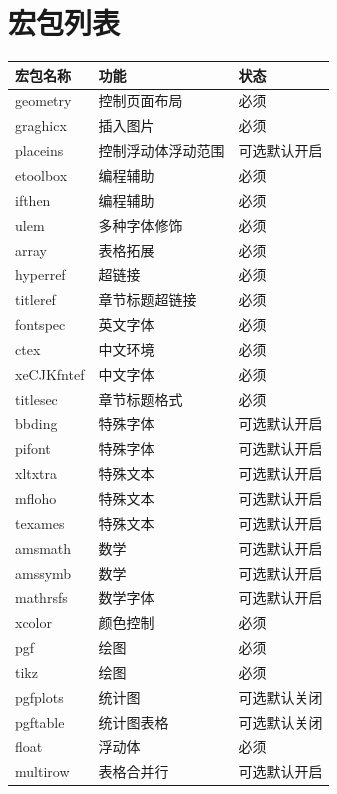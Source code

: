 \documentclass[twoside,maketable]{cauthesis}
\begin{document}
    \section{宏包列表}
    \begin{table}[htbp]
        \centering
        \begin{supertabular}{lll}
            \hline
            宏包名称&功能&状态\\
            \hline
            geometry&控制页面布局&必须\\
            graghicx&插入图片&必须\\
            placeins&控制浮动体浮动范围&可选默认开启\\
            etoolbox&编程辅助&必须\\
            ifthen&编程辅助&必须\\
            ulem&多种字体修饰&必须\\
            array&表格拓展&必须\\
            hyperref&超链接&必须\\
            titleref&章节标题超链接&必须\\
            fontspec&英文字体&必须\\
            ctex&中文环境&必须\\
            xeCJKfntef&中文字体&必须\\
            titlesec&章节标题格式&必须\\
            bbding&特殊字体&可选默认开启\\
            pifont&特殊字体&可选默认开启\\
            xltxtra&特殊文本&可选默认开启\\
            mfloho&特殊文本&可选默认开启\\
            texames&特殊文本&可选默认开启\\
            amsmath&数学&可选默认开启\\
            amssymb&数学&可选默认开启\\
            mathrsfs&数学字体&可选默认开启\\
            xcolor&颜色控制&必须\\
            pgf&绘图&必须\\
            tikz&绘图&必须\\
            pgfplots&统计图&可选默认关闭\\
            pgftable&统计图表格&可选默认关闭\\
            float&浮动体&必须\\
            multirow&表格合并行&可选默认开启\\

\end{supertabular}
\end{table}
\end{document}
